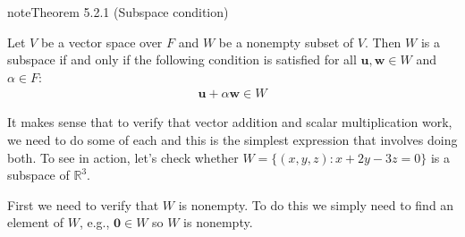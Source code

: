 \documentclass[letterpaper,10pt,english]{jupyterBook}
\begin{document}
\ignorespaces \label{_pages/5.2_Subspaces:subspace-condition-theorem}
\begin{sphinxadmonition}{note}{Theorem 5.2.1 (Subspace condition)}



\sphinxAtStartPar
Let \(V\) be a vector space over \(F\) and \(W\) be a non\sphinxhyphen{}empty subset of \(V\). Then \(W\) is a subspace if and only if the following condition is satisfied for all \(\mathbf{u}, \mathbf{w} \in W\) and \(\alpha \in F\):
\begin{equation}\label{equation:_pages/5.2_Subspaces:subspace-condition-equation}
\begin{split} \mathbf{u} + \alpha \mathbf{w} \in W\end{split}
\end{equation}\end{sphinxadmonition}

\sphinxAtStartPar
It makes sense that to verify that vector addition and scalar multiplication work, we need to do some of each \sphinxhyphen{} and this is the simplest expression that involves doing both. To see {\hyperref[\detokenize{_pages/5.2_Subspaces:subspace-condition-theorem}]{}} in action, let’s check whether \(W = \{(x, y, z) : x + 2y - 3z = 0\}\) is a subspace of \(\mathbb{R}^3\).

\sphinxAtStartPar
First we need to verify that \(W\) is non\sphinxhyphen{}empty. To do this we simply need to find an element of \(W\), e.g., \(\mathbf{0} \in W\) \sphinxhyphen{} so \(W\) is non\sphinxhyphen{}empty.
\end{document}
